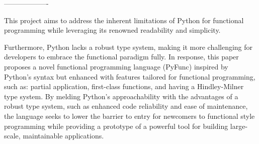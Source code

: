 \documentclass{l4proj}
\begin{document}

\begin{center}
    -------------------
\end{center}




This project aims to address the inherent limitations of Python for functional programming while leveraging its renowned readability and simplicity.

Furthermore, Python lacks a robust type system, making it more challenging for developers to embrace the functional paradigm fully.
In response, this paper proposes a novel functional programming language (PyFunc) inspired by Python's syntax but enhanced with features tailored for functional programming, such as: partial application, first-class functions, and having a Hindley-Milner type system.
By melding Python's approachability with the advantages of a robust type system\citep{Hanenberg_Kleinschmager_Robbes_Tanter_Stefik_2013}, such as enhanced code reliability and ease of maintenance, the language seeks to lower the barrier to entry for newcomers to functional style programming while providing a prototype of a powerful tool for building large-scale, maintainable applications.
\end{document}

